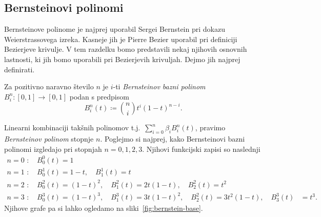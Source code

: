\documentclass[isrm2, tisk]{fmfdelo}
\newcommand{\bernstein}[2]{\binom{#1}{#2}t^{#2}(1-t)^{#1-#2}}
\newcommand{\lilb}[2]{B_{#1}^{#2}(t)}
\newcommand{\bernsteinsum}[2]{\sum_{#1=0}^{#2} \beta_{#1}\lilb{#1}{#2}}
\newcommand{\bsum}{\bernsteinsum{i}{n}}
\begin{document}
    \subsection{Bernsteinovi polinomi}\label{subsec:bernsteinovi-polinomi}
    Bernsteinove polinome je najprej uporabil Sergei Bernstein pri dokazu Weierstrassovega izreka.
    Kasneje jih je Pierre Bezier uporabil pri definiciji Bezierjeve krivulje.
    V tem razdelku bomo predstavili nekaj njihovih osnovnih lastnosti, ki jih bomo uporabili pri Bezierjevih krivuljah.
    Dejmo jih najprej definirati.
    \begin{definicija}
        Za pozitivno naravno število $n$ je $i$-ti \textit{Bernsteinov bazni polinom} $B_i^n: [0,1] \to [0,1] $ podan s predpisom \[B_i^n(t)\coloneqq\bernstein{n}{i}.\]
    \end{definicija}
    \noindent Linearni kombinaciji takšnih polinomov t.j.\ $\bsum$, pravimo \textit{Bernsteinov polinom} stopnje $n$.
    Poglejmo si najprej, kako Bernsteinovi bazni polinomi izgledajo pri stopnjah $n=0,1,2,3$.
    Njihovi funkcijski zapisi so naslednji
    \begin{align*}
       n=0\text{ : } &B_{0}^{0}(t) = 1 \\
       n=1\text{ : } &B_{0}^{1}(t) = 1-t,\quad B_{1}^{1}(t) = t \\
       n=2\text{ : } &B_{0}^{2}(t) = (1-t)^2,\quad B_{1}^{2}(t) = 2t(1-t),\quad B_{2}^{2}(t) = t^2  \\
       n=3\text{ : } &B_{0}^{3}(t) = (1-t)^3,\quad B_{1}^{3}(t) = 3t(1-t)^2,\quad B_{2}^{2}(t) = 3t^2(1-t),\quad B_{3}^{3}(t) &= t^3.
    \end{align*}
    Njihove grafe pa si lahko ogledamo na sliki~\ref{fig:bernstein-base}.
\end{document}
